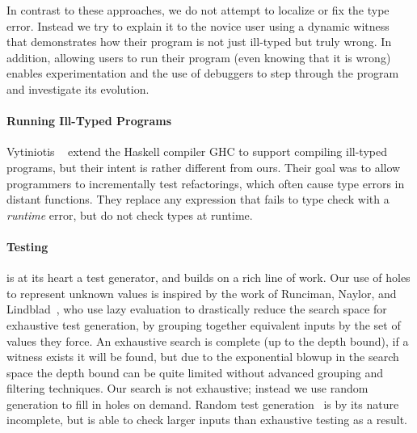 In contrast to these approaches, we do not attempt to localize or fix
the type error. Instead we try to explain it to the novice user using a
dynamic witness that demonstrates how their program is not just
ill-typed but truly wrong. In addition, allowing users to run their
program (even knowing that it is wrong) enables experimentation and the
use of debuggers to step through the program and investigate its
evolution.

\paragraph{Running Ill-Typed Programs}
\label{sec:running-ill-typed}
Vytiniotis \etal~\cite{Vytiniotis2012-gh} extend the Haskell
compiler GHC to support compiling ill-typed programs, but their intent
is rather different from ours. Their goal was to allow programmers to
incrementally test refactorings, which often cause type errors in
distant functions. They replace any expression that fails to type
check with a \emph{runtime} error, but do not check types
at runtime.

\paragraph{Testing}
\label{sec:testing}
\nanomaly is at its heart a test generator, and builds on a rich line of
work.
%
Our use of holes to represent unknown values is inspired by the work of
Runciman, Naylor, and Lindblad~\cite{Runciman2008-ka,Naylor2007-mi,Lindblad2007-oy},
%
who use lazy evaluation to drastically reduce the search space for
exhaustive test generation, by grouping together equivalent inputs by
the set of values they force. An exhaustive search is complete (up to
the depth bound), if a witness exists it will be found, but due to the
exponential blowup in the search space the depth bound can be quite
limited without advanced grouping and filtering techniques.
%
Our search is not exhaustive; instead we use random generation to fill
in holes on demand.
%
Random test generation~\cite{Claessen2000-lj,Csallner2004-bf,Pacheco2007-at}
%
is by its nature incomplete, but is able to check larger inputs than
exhaustive testing as a result.

